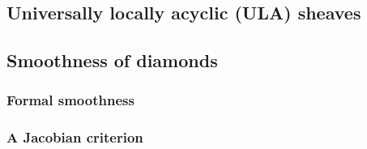         \subsection{Universally locally acyclic (ULA) sheaves}
        
        \subsection{Smoothness of diamonds}
            \subsubsection{Formal smoothness}
            
            \subsubsection{A Jacobian criterion}